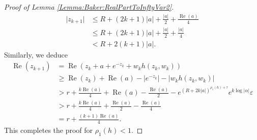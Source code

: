 \documentclass[a4paper, 12pt, twoside]{amsart}
\theoremstyle{definition}
\numberwithin{equation}{section}
\renewcommand{\Re}{\operatorname{Re}}
\begin{document}
\begin{proof}[Proof of Lemma {\ref{Lemma:Baker:RealPartToInftyVar2}}]
	\begin{equation*}
		\begin{split}
			\lvert z_{k+1} \rvert &\leq R + (2k + 1) \lvert a \rvert +  \frac{\lvert a \rvert}{2} + \frac{\Re(a)}{4} \\
			&\leq R + (2k + 1) \lvert a \rvert +  \frac{\lvert a \rvert}{2} + \frac{\lvert a \rvert}{4}\\
			&< R + 2(k+1) \lvert a \rvert.
		\end{split}
	\end{equation*}
	Similarly, we deduce
	\begin{equation*}
		\begin{split}
			\Re(z_{k+1}) &= \Re\left( z_k + a + e^{-z_k} + w_k h(z_k, w_k) \right) \\
			&\geq \Re(z_k) + \Re(a) - \left\lvert e^{-z_k} \right\rvert - \lvert w_k h(z_k, w_k) \rvert \\
			&> r + \frac{k\Re(a)}{4} + \Re(a) - \frac{\Re(a)}{2}  - e^{(R + 2k \lvert a \rvert)^{\rho_1(h) + \tau}} e^{k  \log \lvert \alpha \rvert} \varepsilon\\
			&> r + \frac{k\Re(a)}{4} + \frac{\Re(a)}{2} - \frac{\Re(a)}{4}\\
			&= r + \frac{(k+1)\Re(a)}{4}.
		\end{split}
	\end{equation*}
	This completes the proof for $\rho_1(h) < 1$.
	

\end{proof}
\end{document}

